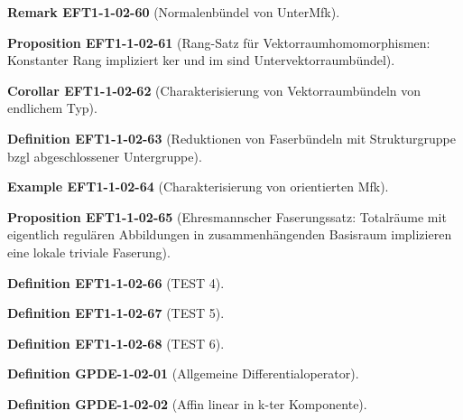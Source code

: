 \documentclass[10pt, letterpaper]{article}
\newcommand{\CustomHeading}[3]{%
  \par\medskip\noindent%
  \textbf{#1 #2} \textnormal{(#3)}.\enskip%
}
\newenvironment{DEF}[2]{\CustomHeading{Definition}{#1}{#2}}{}
\newenvironment{PROP}[2]{\CustomHeading{Proposition}{#1}{#2}}{}
\newenvironment{KORO}[2]{\CustomHeading{Corollar}{#1}{#2}}{}
\newenvironment{REM}[2]{\CustomHeading{Remark}{#1}{#2}}{}
\newenvironment{EXA}[2]{\CustomHeading{Example}{#1}{#2}}{}
\begin{document}
\begin{REM}{EFT1-1-02-60}{Normalenbündel von UnterMfk}
\end{REM}

\begin{PROP}{EFT1-1-02-61}{Rang-Satz für Vektorraumhomomorphismen: Konstanter Rang impliziert ker und im sind Untervektorraumbündel}
\end{PROP}

\begin{KORO}{EFT1-1-02-62}{Charakterisierung von Vektorraumbündeln von endlichem Typ}
\end{KORO}

\begin{DEF}{EFT1-1-02-63}{Reduktionen von Faserbündeln mit Strukturgruppe bzgl abgeschlossener Untergruppe}
\end{DEF}

\begin{EXA}{EFT1-1-02-64}{Charakterisierung von orientierten Mfk}
\end{EXA}

\begin{PROP}{EFT1-1-02-65}{Ehresmannscher Faserungssatz: Totalräume mit eigentlich regulären Abbildungen in zusammenhängenden Basisraum implizieren eine lokale triviale Faserung}
\end{PROP}

\begin{DEF}{EFT1-1-02-66}{TEST 4}
\end{DEF}

\begin{DEF}{EFT1-1-02-67}{TEST 5}
\end{DEF}

\begin{DEF}{EFT1-1-02-68}{TEST 6}
\end{DEF}

\begin{DEF}{GPDE-1-02-01}{Allgemeine Differentialoperator}
\end{DEF}

\begin{DEF}{GPDE-1-02-02}{Affin linear in k-ter Komponente}
\end{DEF}
\end{document}
